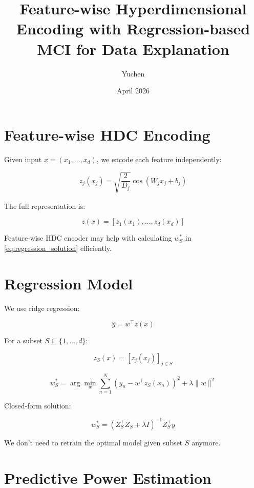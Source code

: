 \documentclass[11pt]{article}
\title{Feature-wise Hyperdimensional Encoding with Regression-based MCI for Data Explanation}
\author{Yuchen}
\date{April 2026}
\begin{document}
\maketitle




\section{Feature-wise HDC Encoding}

Given input $x = (x_1, \dots, x_d)$, we encode each feature independently:

\begin{equation}
z_j(x_j) = \sqrt{\frac{2}{D_j}} \cos(W_j x_j + b_j)
\end{equation}

The full representation is:

\begin{equation}
z(x) = [z_1(x_1), \dots, z_d(x_d)]
\end{equation}

Feature-wise HDC encoder may help with calculating $w_S^*$ in \ref{eq:regression_solution} efficiently. 

\section{Regression Model}

We use ridge regression:

\begin{equation}
\hat{y} = w^\top z(x)
\end{equation}

For a subset $S \subseteq \{1,\dots,d\}$:

\begin{equation}
z_S(x) = [z_j(x_j)]_{j \in S}
\end{equation}

\begin{equation}
w_S^* = \arg\min_w \sum_{n=1}^N (y_n - w^\top z_S(x_n))^2 + \lambda \|w\|^2
\end{equation}

Closed-form solution:

\begin{equation}
w_S^* = (Z_S^\top Z_S + \lambda I)^{-1} Z_S^\top y
\label{eq:regression_solution}
\end{equation}

We don't need to retrain the optimal model given subset $S$ anymore. 

\section{Predictive Power Estimation}
\end{document}
